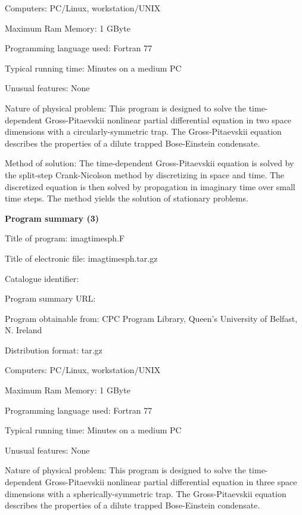 \documentclass[onecolumn]{elsart3p}
\begin{document}
Computers: PC/Linux, workstation/UNIX

Maximum Ram Memory: 1 GByte

Programming language used: Fortran 77




Typical running time: Minutes on a medium PC

Unusual features: None

Nature of physical problem: This program is designed to solve the
time-dependent Gross-Pitaevskii nonlinear partial differential equation
in two space dimensions with a circularly-symmetric trap. The
Gross-Pitaevskii equation describes the properties of a dilute trapped
Bose-Einstein condensate.


Method of solution: The time-dependent Gross-Pitaevskii equation is 
solved by the split-step Crank-Nicolson method by discretizing in space 
and time. The discretized equation is then solved by propagation in 
imaginary time over small time steps.  The method yields the solution of 
stationary problems.  


{\bf Program summary (3)}

Title of program: imagtimesph.F

Title of electronic file: imagtimesph.tar.gz


Catalogue identifier:

Program summary URL: 

Program obtainable from: CPC Program Library, Queen's University of 
Belfast, N. Ireland

Distribution format: tar.gz

Computers: PC/Linux, workstation/UNIX

Maximum Ram Memory: 1 GByte

Programming language used: Fortran 77




Typical running time: Minutes on a medium PC

Unusual features: None

Nature of physical problem: This program is designed to solve the
time-dependent Gross-Pitaevskii nonlinear partial differential equation
in three space dimensions with a spherically-symmetric trap. The
Gross-Pitaevskii equation describes the properties of a dilute trapped
Bose-Einstein condensate.
\end{document}
